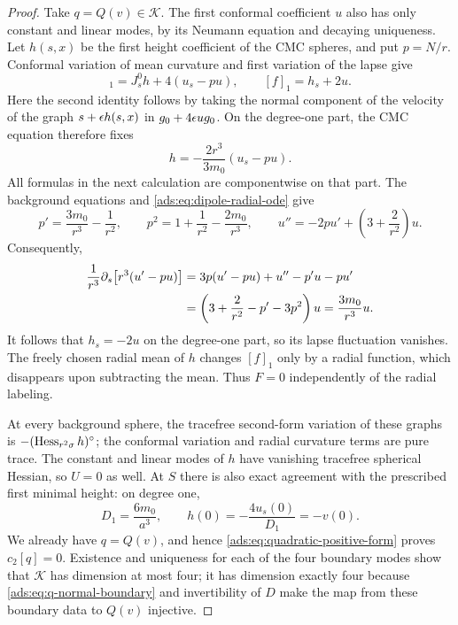 \begin{proof}
Take $q=Q(v)\in\mathcal K$.  The first conformal coefficient $u$
also has only constant and linear modes, by its Neumann equation and
decaying uniqueness.  Let $h(s,x)$ be the first height coefficient
of the CMC spheres, and put $p=N/r$.  Conformal variation of mean
curvature and first variation of the lapse give
\begin{equation}
 [H]_1=J_s^0h+4(u_s-pu),
 \qquad [f]_1=h_s+2u.
 \label{ads:eq:first-cmc-conformal-variations}
\end{equation}
Here the second identity follows by taking the normal component of
the velocity of the graph $s+\epsilon h(s,x)$ in
$g_0+4\epsilon u g_0$.
On the degree-one part, the CMC equation therefore fixes
\begin{equation}
 h=-\frac{2r^3}{3m_0}(u_s-pu).
 \label{ads:eq:dipole-cmc-height}
\end{equation}
All formulas in the next calculation are componentwise on that part.
The background equations and \eqref{ads:eq:dipole-radial-ode} give
\[
 p'=\frac{3m_0}{r^3}-\frac1{r^2},\qquad
 p^2=1+\frac1{r^2}-\frac{2m_0}{r^3},\qquad
 u''=-2pu'+\left(3+\frac2{r^2}\right)u.
\]
Consequently,
\begin{align}
 \frac1{r^3}\partial_s\bigl[r^3(u'-pu)\bigr]
 &=3p(u'-pu)+u''-p'u-pu'\notag\\
 &=\left(3+\frac2{r^2}-p'-3p^2\right)u
 =\frac{3m_0}{r^3}u.
 \label{ads:eq:dipole-cancellation}
\end{align}
It follows that $h_s=-2u$ on the degree-one part, so its lapse
fluctuation vanishes.  The freely chosen radial mean of $h$ changes
$[f]_1$ only by a radial function, which disappears upon subtracting
the mean.  Thus $F=0$ independently of the radial labeling.

At every background sphere, the tracefree second-form variation of
these graphs is $-(\operatorname{Hess}_{r^2\sigma}h)^{\circ}$; the conformal
variation and radial curvature terms are pure trace.
The constant and linear modes of $h$ have vanishing tracefree
spherical Hessian, so $U=0$ as well.
At $S$ there is also exact agreement with the prescribed first minimal
height: on degree one,
\[
 D_1=\frac{6m_0}{a^3},\qquad
 h(0)=-\frac{4u_s(0)}{D_1}=-v(0).
\]
We already have $q=Q(v)$, and hence
\eqref{ads:eq:quadratic-positive-form} proves $c_2[q]=0$.
Existence and uniqueness for each of the four boundary modes show
that $\mathcal K$ has dimension at most four; it has dimension
exactly four because \eqref{ads:eq:q-normal-boundary} and invertibility
of $D$ make the map from these boundary data to $Q(v)$ injective.


\end{proof}
